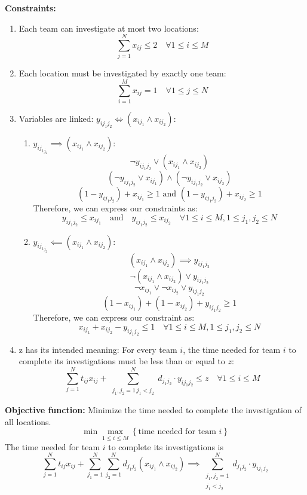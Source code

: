 \documentclass[a4paper,10pt]{article}
\begin{document}
\textbf{Constraints:}
\begin{enumerate}
  \item Each team can investigate at most two locations:
  \[\boxed{
  \sum_{j=1}^N x_{ij} \leq 2 \quad \forall 1 \leq i \leq M}
  \]
  \item Each location must be investigated by exactly one team:
  \[
  \boxed{\sum_{i=1}^M x_{ij} = 1 \quad \forall 1 \leq j \leq N}
  \]
  \item Variables are linked: \(y_{ij_1j_2} \iff (x_{ij_1} \land x_{ij_2})\):
  \begin{enumerate}
    \item  \(y_{ij_{1j_2} } \implies (x_{ij_1} \land x_{ij_2})\):
    \[ \lnot y_{ij_1 j_2} \lor (x_{ij_1} \land x_{ij_2}) \]
    \[ (\lnot y_{ij_1 j_2} \lor x_{ij_1}) \land (\lnot y_{ij_1 j_2} \lor x_{ij_2}) \]
    \[(1-y_{ij_1 j_2}) + x_{ij_1} \geq 1 \text{ and } (1-y_{ij_1 j_2}) + x_{ij_2} \geq 1\]
    Therefore, we can express our constraints as:
    \[
      \boxed{y_{ij_1 j_2} \leq x_{ij_1}} \quad \text{and} \quad \boxed{y_{ij_1 j_2} \leq x_{ij_2}} \quad \forall 1 \leq i \leq M, 1 \leq j_1, j_2 \leq N
    \]
    \item \(y_{ij_{1j_2} } \impliedby (x_{ij_1} \land x_{ij_2})\):
    \[ (x_{ij_1} \land x_{ij_2}) \implies y_{ij_1 j_2} \]
    \[ \lnot (x_{ij_1} \land x_{ij_2}) \lor y_{ij_1 j_2} \]
    \[ \lnot x_{ij_1} \lor \lnot x_{ij_2} \lor y_{ij_1 j_2} \]
    \[ (1 - x_{ij_1}) + (1 - x_{ij_2}) + y_{ij_1 j_2} \geq 1 \]
    Therefore, we can express our constraint as:
    \[
      \boxed{x_{ij_1} + x_{ij_2} - y_{ij_1 j_2} \leq 1} \quad \forall 1 \leq i \leq M, 1 \leq j_1, j_2 \leq N 
    \]
  \end{enumerate}

  \item z has its intended meaning:
  For every team \(i\), the time needed for team \(i\) to complete its investigations must be less than or equal to \(z\):
  \[\boxed{\sum_{j=1}^N t_{ij} x_{ij} + \sum_{\substack{j_1,j_2=1 \frac{}{} j_1<j_2}}^{N} d_{j_1 j_2} \cdot y_{i j_1 j_2} \leq z \quad \forall 1 \leq i \leq M}\]

\end{enumerate}

\textbf{Objective function:}
Minimize the time needed to complete the investigation of all locations.\\
\[
  \min \max _{1 \leq i \leq M} \left\{ \text{time needed for team } i \right\}
\]
The time needed for team \(i\) to complete its investigations is
\[\sum_{j=1}^N t_{ij} x_{ij} + \sum_{j_1=1}^N \sum_{j_2=1}^N d_{j_1 j_2} (x_{i j_1} \wedge x_{i j_2}) \implies \sum_{\substack{j_1,j_2=1 \\ j_1<j_2}}^{N} d_{j_1 j_2} \cdot y_{i j_1 j_2}\]
\end{document}

